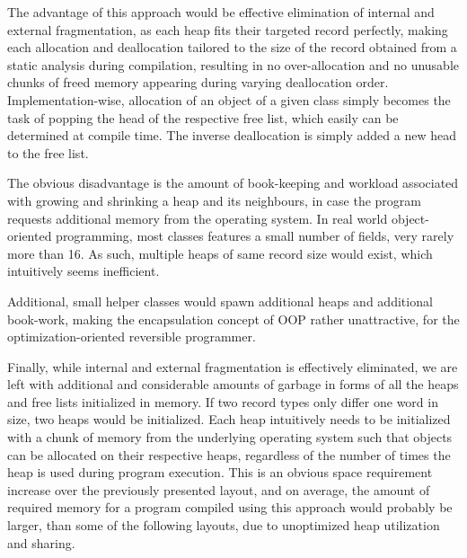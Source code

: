 The advantage of this approach would be effective elimination of internal and external fragmentation, as each heap fits their targeted record perfectly, making each allocation and deallocation tailored to the size of the record obtained from a static analysis during compilation, resulting in no over-allocation and no unusable chunks of freed memory appearing during varying deallocation order. Implementation-wise, allocation of an object of a given class simply becomes the task of popping the head of the respective free list, which easily can be determined at compile time. The inverse deallocation is simply added a new head to the free list. 

The obvious disadvantage is the amount of book-keeping and workload associated with growing and shrinking a heap and its neighbours, in case the program requests additional memory from the operating system. In real world object-oriented programming, most classes features a small number of fields, very rarely more than 16. As such, multiple heaps of same record size would exist, which intuitively seems inefficient. 

Additional, small helper classes would spawn additional heaps and additional book-work, making the encapsulation concept of OOP rather unattractive, for the optimization-oriented reversible programmer. 

Finally, while internal and external fragmentation is effectively eliminated, we are left with additional and considerable amounts of garbage in forms of all the heaps and free lists initialized in memory. If two record types only differ one word in size, two heaps would be initialized. Each heap intuitively needs to be initialized with a chunk of memory from the underlying operating system such that objects can be allocated on their respective heaps, regardless of the number of times the heap is used during program execution. This is an obvious space requirement increase over the previously presented layout, and on average, the amount of required memory for a program compiled using this approach would probably be larger, than some of the following layouts, due to unoptimized heap utilization and sharing.


